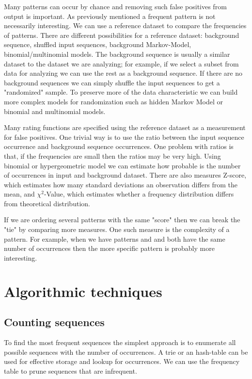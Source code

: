 Many patterns can occur by chance and removing such false positives from output is important. As previously mentioned a frequent pattern is not necessarily interesting. We can use a reference dataset to compare the frequencies of patterns. There are different possibilities for a reference dataset: background sequence, shuffled input sequences, background Markov-Model, binomial/multinomial models. The background sequence is usually a similar dataset to the dataset we are analyzing; for example, if we select a subset from data for analyzing we can use the rest as a background sequence. If there are no background sequences we can simply shuffle the input sequences to get a "randomized" sample. To preserve more of the data characteristic we can build more complex models for randomization such as hidden Markov Model\cite{RatingMarkovModel} or binomial and multinomial models.

Many rating functions are specified using the reference dataset as a measurement for false positives. One trivial way is to use the ratio between the input sequence occurrence and background sequence occurrences. One problem with ratios is that, if the frequencies are small then the ratios may be very high. Using binomial or hypergeometric model we can estimate how probable is the number of occurrences in input and background dataset. There are also measures Z-score, which estimates how many standard deviations an observation differs from the mean, and $\chi^2$-Value, which estimates whether a frequency distribution differs from theoretical distribution.

If we are ordering several patterns with the same "score" then we can break the "tie" by comparing more measures. One such measure is the complexity of a pattern. For example, when we have patterns  and  and both have the same number of occurrences then the more specific pattern is probably more interesting.

\section{Algorithmic techniques}

\WIP

\subsection{Counting sequences}

To find the most frequent sequences the simplest approach is to enumerate all possible sequences with the number of occurrences. A trie or an hash-table can be used for effective storage and lookup for occurrences. We can use the frequency table to prune sequences that are infrequent.







